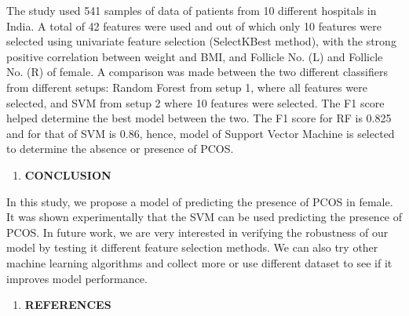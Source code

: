 \documentclass[
]{article}
\begin{document}
The study used 541 samples of data of patients from 10 different
hospitals in India. A total of 42 features were used and out of which
only 10 features were selected using univariate feature selection
(SelectKBest method), with the strong positive correlation between
weight and BMI, and Follicle No. (L) and Follicle No. (R) of female. A
comparison was made between the two different classifiers from different
setups: Random Forest from setup 1, where all features were selected,
and SVM from setup 2 where 10 features were selected. The F1 score
helped determine the best model between the two. The F1 score for RF is
0.825 and for that of SVM is 0.86, hence, model of Support Vector
Machine is selected to determine the absence or presence of PCOS.

\begin{enumerate}
\def\labelenumi{\Roman{enumi}.}
\setcounter{enumi}{3}
\item
  \textbf{CONCLUSION}
\end{enumerate}

In this study, we propose a model of predicting the presence of PCOS in
female. It was shown experimentally that the SVM can be used predicting
the presence of PCOS. In future work, we are very interested in
verifying the robustness of our model by testing it different feature
selection methods. We can also try other machine learning algorithms and
collect more or use different dataset to see if it improves model
performance.

\begin{enumerate}
\def\labelenumi{\Roman{enumi}.}
\setcounter{enumi}{4}
\item
  \textbf{REFERENCES}
\end{enumerate}
\end{document}
